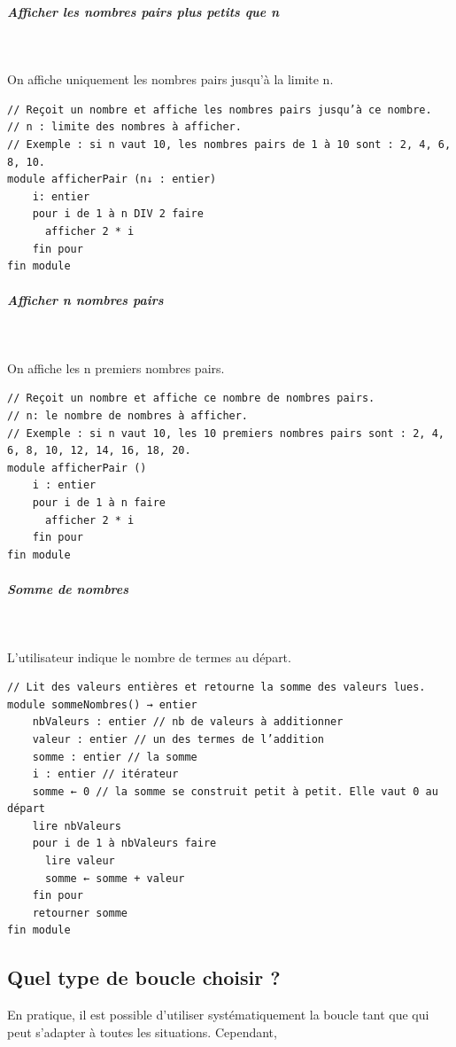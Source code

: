 \documentclass[11pt,a4paper]{article}
\begin{document}
		\subparagraph{Afficher les nombres pairs plus petits que n} 
		
					\textcolor{white}{.} \par
				On affiche uniquement les nombres pairs jusqu'\`a la limite n.
            \par
        \begin{verbatim}
// Reçoit un nombre et affiche les nombres pairs jusqu’à ce nombre.
// n : limite des nombres à afficher.
// Exemple : si n vaut 10, les nombres pairs de 1 à 10 sont : 2, 4, 6, 8, 10.
module afficherPair (n↓ : entier)
    i: entier
    pour i de 1 à n DIV 2 faire
      afficher 2 * i
    fin pour
fin module
    \end{verbatim}
			
		\subparagraph{Afficher n nombres pairs} 
		
					\textcolor{white}{.} \par
				On affiche les n premiers nombres pairs.
            \par
        \begin{verbatim}
// Reçoit un nombre et affiche ce nombre de nombres pairs.
// n: le nombre de nombres à afficher.
// Exemple : si n vaut 10, les 10 premiers nombres pairs sont : 2, 4, 6, 8, 10, 12, 14, 16, 18, 20.
module afficherPair ()
    i : entier
    pour i de 1 à n faire
      afficher 2 * i
    fin pour
fin module
    \end{verbatim}
			
		\subparagraph{Somme de nombres} 
		
					\textcolor{white}{.} \par
				L'utilisateur indique le nombre de termes au d\'epart.
            \par
        \begin{verbatim}
// Lit des valeurs entières et retourne la somme des valeurs lues.
module sommeNombres() → entier
    nbValeurs : entier // nb de valeurs à additionner
    valeur : entier // un des termes de l’addition
    somme : entier // la somme
    i : entier // itérateur
    somme ← 0 // la somme se construit petit à petit. Elle vaut 0 au départ
    lire nbValeurs
    pour i de 1 à nbValeurs faire
      lire valeur
      somme ← somme + valeur
    fin pour
    retourner somme
fin module
    \end{verbatim}\subsection{Quel type de boucle choisir ?}
		    En pratique, il est possible d'utiliser syst\'ematiquement la boucle tant que qui peut s'adapter
        \`a toutes les situations. Cependant, 
        
\end{document}
